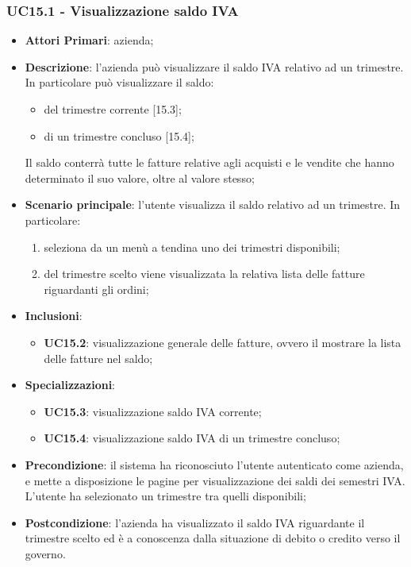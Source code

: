 \subsubsection{UC15.1 - Visualizzazione saldo IVA}
\begin{itemize}
	\item \textbf{Attori Primari}: azienda;
	\item \textbf{Descrizione}: l'azienda può visualizzare il saldo IVA relativo ad un trimestre. In particolare può visualizzare il saldo:
	\begin{itemize}
		\item del trimestre corrente [15.3];
		\item di un trimestre concluso [15.4];
	\end{itemize}
	Il saldo conterrà tutte le fatture relative agli acquisti e le vendite che hanno determinato il suo valore, oltre al valore stesso;
	\item \textbf{Scenario principale}: l'utente visualizza il saldo relativo ad un trimestre. In particolare:
	\begin{enumerate}[label=\alph*.]
		\item seleziona da un menù a tendina uno dei trimestri disponibili;
		\item del trimestre scelto viene visualizzata la relativa lista delle fatture riguardanti gli ordini; 
	\end{enumerate}
	\item \textbf{Inclusioni}: 
	\begin{itemize}
		\item \textbf{UC15.2}: visualizzazione generale delle fatture, ovvero il mostrare la lista delle fatture nel saldo;
	\end{itemize}
	\item \textbf{Specializzazioni}: 
	\begin{itemize}
		\item \textbf{UC15.3}: visualizzazione saldo IVA corrente;
		\item \textbf{UC15.4}:  visualizzazione saldo IVA di un trimestre concluso;
	\end{itemize}
	\item \textbf{Precondizione}: il sistema ha riconosciuto l'utente autenticato come azienda, e mette a disposizione le pagine per visualizzazione dei saldi dei semestri IVA. L'utente ha selezionato un trimestre tra quelli disponibili;
	\item \textbf{Postcondizione}: l'azienda ha visualizzato il saldo IVA riguardante il trimestre scelto ed è a conoscenza dalla situazione di debito o credito verso il governo.
\end{itemize} 
